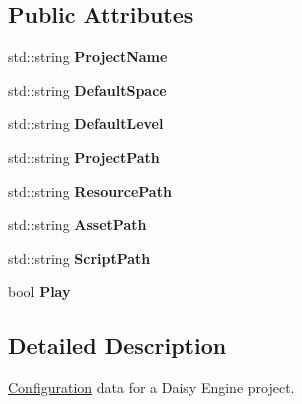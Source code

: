 \subsection*{Public Attributes}
\begin{DoxyCompactItemize}
\item 
\hypertarget{structDCEngine_1_1ProjectData_aa41230f9780183e8c197239f75da90f0}{std\-::string {\bfseries Project\-Name}}\label{structDCEngine_1_1ProjectData_aa41230f9780183e8c197239f75da90f0}

\item 
\hypertarget{structDCEngine_1_1ProjectData_a66849bbf0b28f93a561198b5c3ad0440}{std\-::string {\bfseries Default\-Space}}\label{structDCEngine_1_1ProjectData_a66849bbf0b28f93a561198b5c3ad0440}

\item 
\hypertarget{structDCEngine_1_1ProjectData_a3acdf84902c31495985c318a043aea76}{std\-::string {\bfseries Default\-Level}}\label{structDCEngine_1_1ProjectData_a3acdf84902c31495985c318a043aea76}

\item 
\hypertarget{structDCEngine_1_1ProjectData_a5f5708312fc2772cebce2625d183d6bf}{std\-::string {\bfseries Project\-Path}}\label{structDCEngine_1_1ProjectData_a5f5708312fc2772cebce2625d183d6bf}

\item 
\hypertarget{structDCEngine_1_1ProjectData_a2741bb148767f67f9e3997f87e8bff8c}{std\-::string {\bfseries Resource\-Path}}\label{structDCEngine_1_1ProjectData_a2741bb148767f67f9e3997f87e8bff8c}

\item 
\hypertarget{structDCEngine_1_1ProjectData_a51ad2e07d0fb044092830b77284a35d3}{std\-::string {\bfseries Asset\-Path}}\label{structDCEngine_1_1ProjectData_a51ad2e07d0fb044092830b77284a35d3}

\item 
\hypertarget{structDCEngine_1_1ProjectData_afa0e646f743eb2c34d3c1d40e5005764}{std\-::string {\bfseries Script\-Path}}\label{structDCEngine_1_1ProjectData_afa0e646f743eb2c34d3c1d40e5005764}

\item 
\hypertarget{structDCEngine_1_1ProjectData_a586ec3a0e00bc95747b43712f3e4a08e}{bool {\bfseries Play}}\label{structDCEngine_1_1ProjectData_a586ec3a0e00bc95747b43712f3e4a08e}

\end{DoxyCompactItemize}


\subsection{Detailed Description}
\hyperlink{structConfiguration}{Configuration} data for a Daisy Engine project. 

